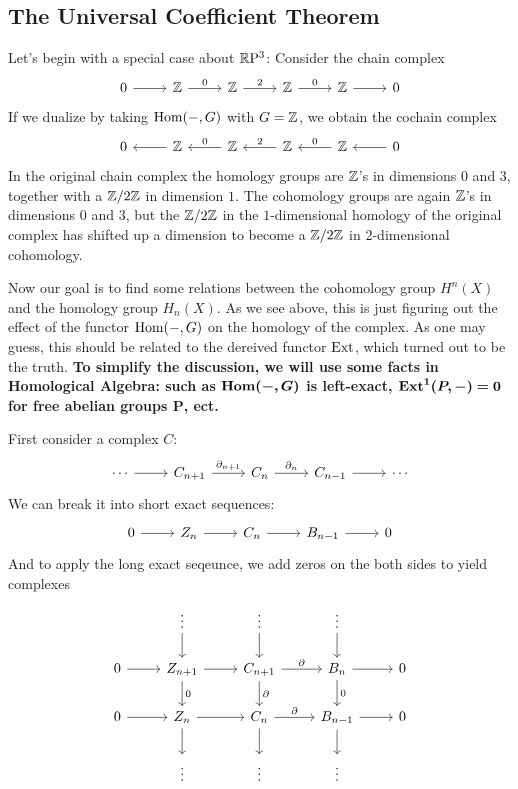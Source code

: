 \subsection{The Universal Coefficient Theorem}
Let's begin with a special case about $\mathbb{R}\mathrm{P}^3$: Consider the chain complex
\[\begin{tikzcd}
0\ar[r]&\Z\ar[r,"0"]&\Z\ar[r,"2"]&\Z\ar[r,"0"]&\Z\ar[r]&0
\end{tikzcd}\]
If we dualize by taking $\mathrm{Hom}(-,G)$ with $G=\mathbb{Z}$, we obtain the cochain complex
\[\begin{tikzcd}
0&\Z\ar[l]&\Z\ar[l,swap,"0"]&\Z\ar[l,swap,"2"]&\Z\ar[l,swap,"0"]&0\ar[l]
\end{tikzcd}\]
In the original chain complex the homology groups are $\mathbb{Z}$'s in dimensions $0$ and $3$, together with a $\mathbb{Z}/2\mathbb{Z}$ in dimension $1$. The cohomology groups are again $\mathbb{Z}$'s in dimensions $0$ and $3$, but the $\mathbb{Z}/2\mathbb{Z}$ in the $1$-dimensional homology of the original complex has shifted up a dimension to become a $\mathbb{Z}/2\mathbb{Z}$ in $2$-dimensional cohomology.\par
Now our goal is to find some relations between the cohomology group $H^n(X)$ and the homology group $H_n(X)$. As we see above, this is just figuring out the effect of the functor $\mathrm{Hom}(-,G)$ on the homology of the complex. As one may guess, this should be related to the dereived functor $\mathrm{Ext}$, which turned out to be the truth. \textbf{To simplify the discussion, we will use some facts in Homological Algebra: such as $\bm{\mathrm{Hom}(-,G)}$ is left-exact, $\bm{\mathrm{Ext}^1(P,-)=0}$ for free abelian groups $\bm{P}$, ect.}\par
First consider a complex $C$:
\[\begin{tikzcd}
\cdots\ar[r]&C_{n+1}\ar[r,"\partial_{n+1}"]&C_n\ar[r,"\partial_{n}"]&C_{n-1}\ar[r]&\cdots
\end{tikzcd}\]
We can break it into short exact sequences:
\[\begin{tikzcd}
0\ar[r]&Z_n\ar[r]&C_n\ar[r]&B_{n-1}\ar[r]&0
\end{tikzcd}\]
And to apply the long exact seqeunce, we add zeros on the both sides to yield complexes
\[\begin{tikzcd}
&\vdots\ar[d]&\vdots\ar[d]&\vdots\ar[d]&\\
0\ar[r]&Z_{n+1}\ar[d,"0"]\ar[r]&C_{n+1}\ar[d,"\partial"]\ar[r,"\partial"]&B_{n}\ar[r]\ar[d,"0"]&0\\
0\ar[r]&Z_{n}\ar[r]\ar[d]&C_n\ar[r,"\partial"]\ar[d]&B_{n-1}\ar[r]\ar[d]&0\\
&\vdots&\vdots&\vdots&
\end{tikzcd}\]
